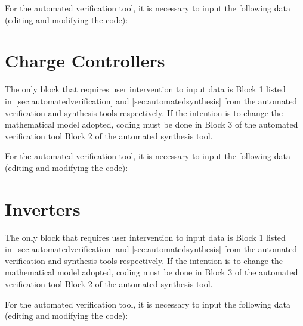 For the automated verification tool, it is necessary to input the following data (editing and modifying the code):

\section{Charge Controllers}

The only block that requires user intervention to input data is Block 1 listed in~\ref{sec:automatedverification} and \ref{sec:automatedsynthesis} from the automated verification and synthesis tools respectively. If the intention is to change the mathematical model adopted, coding must be done in Block 3 of the automated verification tool Block 2 of the automated synthesis tool.

For the automated verification tool, it is necessary to input the following data (editing and modifying the code):


\section{Inverters}

The only block that requires user intervention to input data is Block 1 listed in~\ref{sec:automatedverification} and \ref{sec:automatedsynthesis} from the automated verification and synthesis tools respectively. If the intention is to change the mathematical model adopted, coding must be done in Block 3 of the automated verification tool Block 2 of the automated synthesis tool.

For the automated verification tool, it is necessary to input the following data (editing and modifying the code):